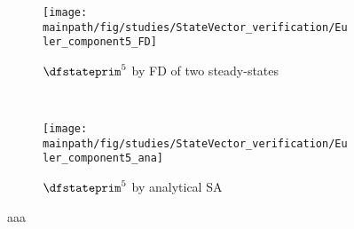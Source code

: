 \documentclass[../main.tex]{subfiles}
\begin{document}
\begin{figure}[t!]
    
    \begin{subfigure}[t]{0.5\textwidth}
        \centering
        \texttt{[image: \\mainpath/fig/studies/StateVector\_verification/Euler\_component5\_FD]}
        \caption{$\dfstateprim^5$ by \ac{FD} of two steady-states}
    \end{subfigure}%
    ~ 
    \begin{subfigure}[t]{0.5\textwidth}
        \centering
        \texttt{[image: \\mainpath/fig/studies/StateVector\_verification/Euler\_component5\_ana]}
        \caption{$\dfstateprim^5$ by analytical \ac{SA}}
    \end{subfigure}
    \caption[aaa]{aaa}
    \label{fig:dwds_verification_embedded_euler}
    
\end{figure}
\end{document}
